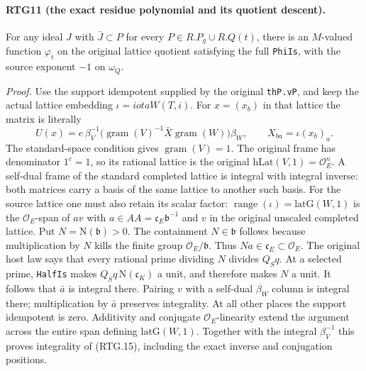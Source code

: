 \paragraph{RTG11 (the exact residue polynomial and its quotient descent).}
\label{claim:RTG11}
For any ideal $J$ with $\bar J\subset P$ for every
$P\in R.P_g\cup R.Q(t)$, there is an $M$-valued function $\varphi_t$
on the original lattice quotient satisfying the full \texttt{PhiIs},
with the source exponent $-1$ on $\omega_Q$.

\emph{Proof.}
Use the support idempotent supplied by the original \texttt{thP.vP},
and keep the actual lattice embedding $\iota=iotaW(T,i)$.
For $x=(x_b)$ in that lattice the matrix is literally
\[
 U(x)=e\,\beta_V^{-1}
       \bigl(\operatorname{gram}(V)^{-1}\bar X
                          \operatorname{gram}(W)\bigr)\beta_W,
 \qquad X_{ba}=\iota(x_b)_a.                                \tag{RTG.15}
\]
The standard-space condition gives $\operatorname{gram}(V)=1$.
The original frame has denominator $1^c=1$, so its rational lattice
is the original $\mathrm{hLat}(V,1)=\mathcal O_E^n$.
A self-dual frame of the standard completed lattice is integral with
integral inverse: both matrices carry a basis of the same lattice to
another such basis.  For the source lattice one must also retain its
scalar factor: $\operatorname{range}(\iota)=\mathrm{latG}(W,1)$ is the
$\mathcal O_E$-span of $a v$ with
$a\in AA=\mathfrak c_E\mathfrak b^{-1}$ and $v$ in the original
unscaled completed lattice.  Put $N=\mathrm N(\mathfrak b)>0$.
The containment $N\in\mathfrak b$ follows because multiplication
by $N$ kills the finite group $\mathcal O_E/\mathfrak b$.
Thus $Na\in\mathfrak c_E\subset\mathcal O_E$.
The original host law says that every rational prime dividing $N$
divides $Q_Sq$.  At a selected prime, \texttt{HalfIs} makes
$Q_Sq\,\mathrm N(\mathfrak c_K)$ a unit, and therefore makes $N$
a unit.  It follows that $\bar a$ is integral there.
Pairing $v$ with a self-dual $\beta_W$ column is integral there;
multiplication by $\bar a$ preserves integrality.  At all other
places the support idempotent is zero.  Additivity and conjugate
$\mathcal O_E$-linearity extend the argument across the entire
span defining $\mathrm{latG}(W,1)$.  Together with the integral
$\beta_V^{-1}$ this proves integrality of (RTG.15), including
the exact inverse and conjugation positions.

